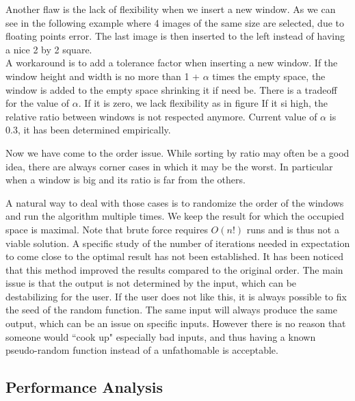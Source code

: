 \documentclass{acmtog}
\begin{document}
Another flaw is the lack of flexibility when we insert a new window. As we can see in the following example where 4 images of the same size are selected, due to floating points error. The last image is then inserted to the left instead of having a nice 2 by 2 square.  %
\\ 
A workaround is to add a tolerance factor when inserting a new window. If the window height and width is no more than 1 + $\alpha$ times the empty space, the window is added to the empty space shrinking it if need be. There is a tradeoff for the value of $\alpha$. If it is zero, we lack flexibility as in figure %
If it si high, the relative ratio between windows is not respected anymore. Current value of $\alpha$ is 0.3, it has been determined empirically. %

Now we have come to the order issue. While sorting by ratio may often be a good idea, there are always corner cases in which it may be the worst. In particular when a window is big and its ratio is far from the others.

A natural way to deal with those cases is to randomize the order of the windows and run the algorithm multiple times. We keep the result for which the occupied space is maximal. Note that brute force requires $O(n!)$ runs and is thus not a viable solution. A specific study of the number of iterations needed in expectation to come close to the optimal result has not been established. It has been noticed that this method improved the results compared to the original order. The main issue is that the output is not determined by the input, which can be destabilizing for the user. If the user does not like this, it is always possible to fix the seed of the random function. The same input will always produce the same output, which can be an issue on specific inputs. However there is no reason that someone would ``cook up" especially bad inputs, and thus having a known pseudo-random function instead of a unfathomable is acceptable.  

\subsection{Performance Analysis}

\begin{acks}
 
\end{acks}




 
\end{document}
